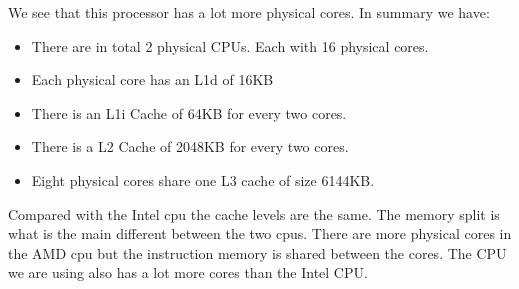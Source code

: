 We see that this processor has a lot more physical cores. In summary we have:

\begin{itemize}
    \item There are in total 2 physical CPUs. Each with 16 physical cores.
    \item Each physical core has an L1d of 16KB
    \item There is an L1i Cache of 64KB for every two cores. 
    \item There is a L2 Cache of 2048KB for every two cores.
    \item Eight physical cores share one L3 cache of size 6144KB.
\end{itemize}

Compared with the Intel cpu the cache levels are the same. The memory split
is what is the main different between the two cpus. There are more physical
cores in the AMD cpu but the instruction memory is shared between the cores. 
The CPU we are using also has a lot more cores than the Intel CPU.